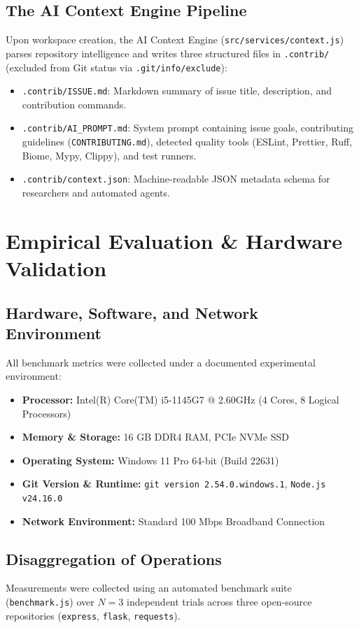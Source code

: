 \documentclass[10pt,conference]{IEEEtran}
\begin{document}
\subsection{The AI Context Engine Pipeline}
Upon workspace creation, the AI Context Engine (\texttt{src/services/context.js}) parses repository intelligence and writes three structured files in \texttt{.contrib/} (excluded from Git status via \texttt{.git/info/exclude}):
\begin{itemize}
    \item \texttt{.contrib/ISSUE.md}: Markdown summary of issue title, description, and contribution commands.
    \item \texttt{.contrib/AI\_PROMPT.md}: System prompt containing issue goals, contributing guidelines (\texttt{CONTRIBUTING.md}), detected quality tools (ESLint, Prettier, Ruff, Biome, Mypy, Clippy), and test runners.
    \item \texttt{.contrib/context.json}: Machine-readable JSON metadata schema for researchers and automated agents.
\end{itemize}

\section{Empirical Evaluation \& Hardware Validation}

\subsection{Hardware, Software, and Network Environment}
All benchmark metrics were collected under a documented experimental environment:
\begin{itemize}
    \item \textbf{Processor:} Intel(R) Core(TM) i5-1145G7 @ 2.60GHz (4 Cores, 8 Logical Processors)
    \item \textbf{Memory \& Storage:} 16 GB DDR4 RAM, PCIe NVMe SSD
    \item \textbf{Operating System:} Windows 11 Pro 64-bit (Build 22631)
    \item \textbf{Git Version \& Runtime:} \texttt{git version 2.54.0.windows.1}, \texttt{Node.js v24.16.0}
    \item \textbf{Network Environment:} Standard 100 Mbps Broadband Connection
\end{itemize}

\subsection{Disaggregation of Operations}
Measurements were collected using an automated benchmark suite (\texttt{benchmark.js}) over $N=3$ independent trials across three open-source repositories (\texttt{express}, \texttt{flask}, \texttt{requests}).
\end{document}
